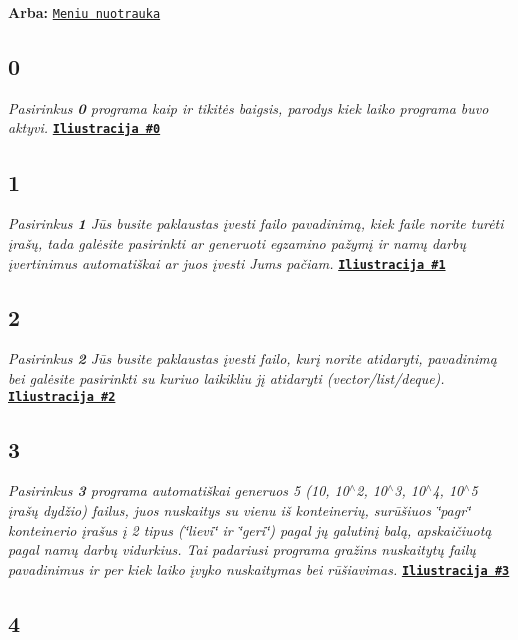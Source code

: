 {\bfseries Arba\+:} \href{https://gyazo.com/9c2eff8231fa73817b48c713a1f55d1c}{\tt Meniu nuotrauka}

\subsection*{0}

{\itshape Pasirinkus {\bfseries 0} programa kaip ir tikitės baigsis, parodys kiek laiko programa buvo aktyvi.} \href{https://gyazo.com/092a6b2fd577d833bff496f68325c0ff}{\tt {\bfseries Iliustracija \#0}}

\subsection*{1}

{\itshape Pasirinkus {\bfseries 1} Jūs busite paklaustas įvesti failo pavadinimą, kiek faile norite turėti įrašų, tada galėsite pasirinkti ar generuoti egzamino pažymį ir namų darbų įvertinimus automatiškai ar juos įvesti Jums pačiam.} \href{https://gyazo.com/0f9ab18b79c812de4335e95fd6494cab}{\tt {\bfseries Iliustracija \#1}}

\subsection*{2}

{\itshape Pasirinkus {\bfseries 2} Jūs busite paklaustas įvesti failo, kurį norite atidaryti, pavadinimą bei galėsite pasirinkti su kuriuo laikikliu jį atidaryti (vector/list/deque).} \href{https://gyazo.com/681e2257febd29db1154daa58b56ecb5}{\tt {\bfseries Iliustracija \#2}}

\subsection*{3}

{\itshape Pasirinkus {\bfseries 3} programa automatiškai generuos 5 (10, 10$^\wedge$2, 10$^\wedge$3, 10$^\wedge$4, 10$^\wedge$5 įrašų dydžio) failus, juos nuskaitys su vienu iš konteinerių, surūšiuos \char`\"{}pagr\char`\"{} konteinerio įrašus į 2 tipus (\char`\"{}lievi\char`\"{} ir \char`\"{}geri\char`\"{}) pagal jų galutinį balą, apskaičiuotą pagal namų darbų vidurkius. Tai padariusi programa gražins nuskaitytų failų pavadinimus ir per kiek laiko įvyko nuskaitymas bei rūšiavimas.} \href{https://gyazo.com/a7fe7bea97258ca5a3c0ed2d4074b370}{\tt {\bfseries Iliustracija \#3}}

\subsection*{4}


